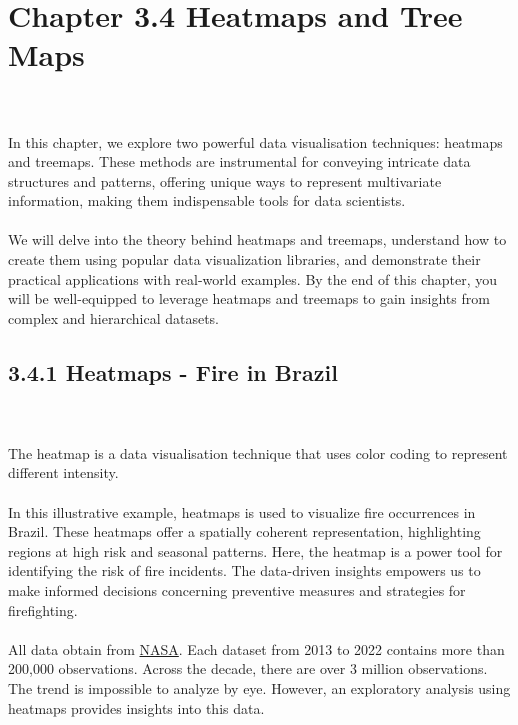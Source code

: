 \documentclass{article}\usepackage[]{graphicx}\usepackage[]{xcolor}
\begin{document}
\section{Chapter 3.4 Heatmaps and Tree Maps}
\\  
\\In this chapter, we explore two powerful data visualisation techniques: heatmaps and treemaps. These methods are instrumental for conveying intricate data structures and patterns, offering unique ways to represent multivariate information, making them indispensable tools for data scientists.
\\  
\\We will delve into the theory behind heatmaps and treemaps, understand how to create them using popular data visualization libraries, and demonstrate their practical applications with real-world examples. By the end of this chapter, you will be well-equipped to leverage heatmaps and treemaps to gain insights from complex and hierarchical datasets.

\subsection{3.4.1 Heatmaps - Fire in Brazil}
\\  
\\The heatmap is a data visualisation technique that uses color coding to represent different intensity.
\\  
\\In this illustrative example, heatmaps is used to visualize fire occurrences in Brazil. These heatmaps offer a spatially coherent representation, highlighting regions at high risk and seasonal patterns. Here, the heatmap is a power tool for identifying the risk of fire incidents. The data-driven insights empowers us to make informed decisions concerning preventive measures and strategies for firefighting.
\\  
\\All data obtain from \href{https://firms.modaps.eosdis.nasa.gov/}{NASA}. Each dataset from 2013 to 2022 contains more than 200,000 observations. Across the decade, there are over 3 million observations. The trend is impossible to analyze by eye. However, an exploratory analysis using heatmaps provides insights into this data.
\end{document}
